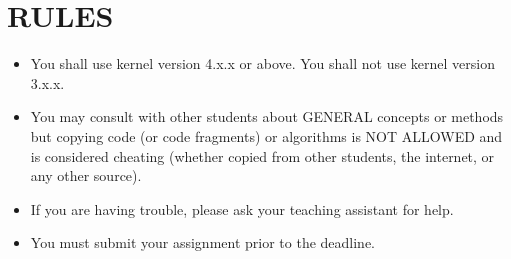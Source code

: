 \documentclass{article}
\begin{document}
\section*{RULES}

\begin{itemize}
    \item You shall use kernel version 4.x.x or above. You shall not use kernel version 3.x.x.
    \item You may consult with other students about GENERAL concepts or methods but copying code (or code fragments) or algorithms is NOT ALLOWED and is considered cheating (whether copied from other students, the internet, or any other source).
    \item If you are having trouble, please ask your teaching assistant for help.
    \item You must submit your assignment prior to the deadline.
\end{itemize}
\end{document}

